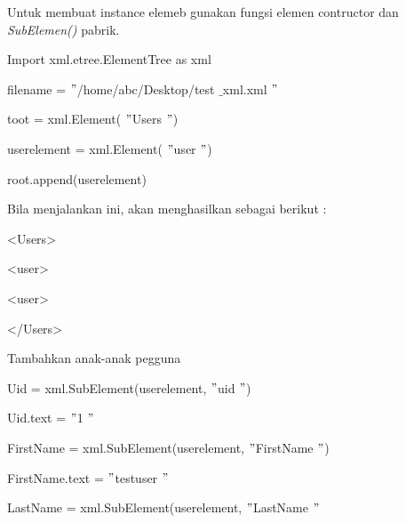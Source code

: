 \vspace{12pt}
\noindent 
 \hspace*{0.5in} Untuk membuat instance elemeb gunakan fungsi elemen contructor dan \textit{SubElemen()} pabrik. \par
\noindent 
Import xml.etree.ElementTree as xml \par
\vspace{12pt}
\noindent 
{\fontsize{10pt}{10pt}\selectfont filename =  $ " $/home/abc/Desktop/test $  \_  $xml.xml $ " $} \par
\noindent 
{\fontsize{10pt}{10pt}\selectfont toot = xml.Element( $ " $Users $ " $)} \par
\noindent 
{\fontsize{10pt}{10pt}\selectfont userelement = xml.Element( $ " $user $ " $)} \par
\noindent 
{\fontsize{10pt}{10pt}\selectfont root.append(userelement)} \par
\noindent 
\vspace{10pt}
\noindent 
Bila menjalankan ini, akan menghasilkan sebagai berikut : \par
\noindent 
{\fontsize{10pt}{10pt}\selectfont <Users>} \par
\noindent 
{\fontsize{10pt}{10pt}\selectfont  \hspace*{0.5in} <user>} \par
\noindent 
{\fontsize{10pt}{10pt}\selectfont  \hspace*{0.5in} <user>} \par
\noindent 
{\fontsize{10pt}{10pt}\selectfont </Users>} \par
\vspace{10pt}
\vspace{10pt}
\vspace{10pt}
\noindent 
Tambahkan anak-anak pegguna \par
\vspace{10pt}
\noindent 
{\fontsize{10pt}{10pt}\selectfont Uid = xml.SubElement(userelement,  $ " $uid $ " $)} \par
\noindent 
{\fontsize{10pt}{10pt}\selectfont Uid.text =  $ " $1 $ " $} \par
\vspace{10pt}
\noindent 
{\fontsize{10pt}{10pt}\selectfont FirstName = xml.SubElement(userelement,  $ " $FirstName $ " $)} \par
\noindent 
{\fontsize{10pt}{10pt}\selectfont FirstName.text =  $ " $testuser $ " $} \par
\vspace{10pt}
\noindent 
{\fontsize{10pt}{10pt}\selectfont LastName = xml.SubElement(userelement,  $ " $LastName $ " $} \par
